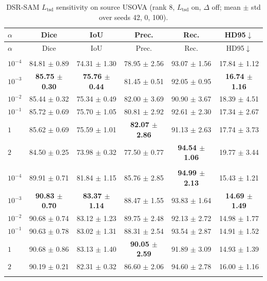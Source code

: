 \documentclass[10pt]{article}
\begin{document}
{\small
\begin{longtable}{lccccc}
\caption{DSR-SAM $L_{\mathrm{tsd}}$ sensitivity on source USOVA (rank 8, $L_{\mathrm{tsd}}$ on, $\Delta$ off; mean $\pm$ std over seeds 42, 0, 100).}
\label{tab:ltsd_alpha_usova}\\
\toprule
$\alpha$ & Dice & IoU & Prec. & Rec. & HD95$\downarrow$ \\
\midrule
\endfirsthead
\toprule
$\alpha$ & Dice & IoU & Prec. & Rec. & HD95$\downarrow$ \\
\midrule
\endhead
\endfoot
\bottomrule
\endlastfoot
\multicolumn{6}{l}{\textit{Target: OTU}} \\
\midrule
$10^{-4}$ & 84.81 $\pm$ 0.89 & 74.31 $\pm$ 1.30 & 78.95 $\pm$ 2.56 & 93.07 $\pm$ 1.56 & 17.84 $\pm$ 1.12 \\
$10^{-3}$ & \textbf{85.75 $\pm$ 0.30} & \textbf{75.76 $\pm$ 0.44} & 81.45 $\pm$ 0.51 & 92.05 $\pm$ 0.95 & \textbf{16.74 $\pm$ 1.16} \\
$10^{-2}$ & 85.44 $\pm$ 0.32 & 75.34 $\pm$ 0.49 & 82.00 $\pm$ 3.69 & 90.90 $\pm$ 3.67 & 18.39 $\pm$ 4.51 \\
$10^{-1}$ & 85.72 $\pm$ 0.69 & 75.70 $\pm$ 1.05 & 80.81 $\pm$ 2.92 & 92.61 $\pm$ 2.30 & 17.34 $\pm$ 2.67 \\
$1$ & 85.62 $\pm$ 0.69 & 75.59 $\pm$ 1.01 & \textbf{82.07 $\pm$ 2.86} & 91.13 $\pm$ 2.63 & 17.74 $\pm$ 3.73 \\
$2$ & 84.50 $\pm$ 0.25 & 73.98 $\pm$ 0.32 & 77.50 $\pm$ 0.77 & \textbf{94.54 $\pm$ 1.06} & 19.77 $\pm$ 3.44 \\
\addlinespace[4pt]
\multicolumn{6}{l}{\textit{Target: OVATUS}} \\
\midrule
$10^{-4}$ & 89.91 $\pm$ 0.71 & 81.84 $\pm$ 1.15 & 85.76 $\pm$ 2.85 & \textbf{94.99 $\pm$ 2.13} & 15.43 $\pm$ 1.21 \\
$10^{-3}$ & \textbf{90.83 $\pm$ 0.70} & \textbf{83.37 $\pm$ 1.14} & 88.47 $\pm$ 1.55 & 93.83 $\pm$ 1.64 & \textbf{14.69 $\pm$ 1.49} \\
$10^{-2}$ & 90.68 $\pm$ 0.74 & 83.12 $\pm$ 1.23 & 89.75 $\pm$ 2.48 & 92.13 $\pm$ 2.72 & 14.98 $\pm$ 1.77 \\
$10^{-1}$ & 90.63 $\pm$ 0.78 & 83.02 $\pm$ 1.31 & 88.31 $\pm$ 2.54 & 93.54 $\pm$ 2.87 & 14.91 $\pm$ 1.52 \\
$1$ & 90.68 $\pm$ 0.86 & 83.13 $\pm$ 1.40 & \textbf{90.05 $\pm$ 2.59} & 91.89 $\pm$ 3.09 & 14.93 $\pm$ 1.39 \\
$2$ & 90.19 $\pm$ 0.21 & 82.31 $\pm$ 0.32 & 86.60 $\pm$ 2.06 & 94.60 $\pm$ 2.78 & 16.00 $\pm$ 1.16 \\
\addlinespace[4pt]
\end{longtable}
}
\end{document}
